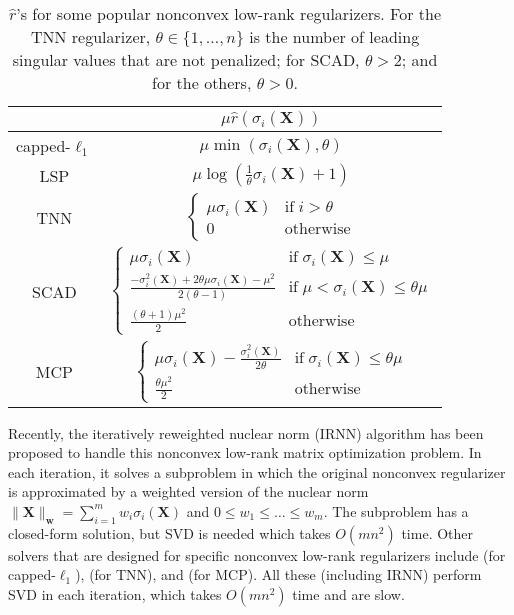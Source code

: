 \documentclass[10pt,journal,compsoc]{IEEEtran}
\newcommand{\X}{\mathbf{X}}
\newcommand{\NM}[2]{\| #1 \|_{#2} }
\begin{document}
\begin{table}[ht]
\centering
\caption{$\hat{r}$'s for some popular nonconvex low-rank regularizers. 
For the TNN regularizer, $\theta \in \{1,\dots,n\}$ is the number of leading singular values that are not penalized;
for SCAD, $\theta > 2$;
and for the others, $\theta > 0$.}
\vspace{-10px}
\begin{tabular}{c | c} \hline
	& $\mu\hat{r}(\sigma_i(\X))$
	\\ \hline
	capped-$\ell_1$ \cite{zhang2010analysis} & $\mu\min(\sigma_i(\X), \theta )$  \\ \hline
	LSP \cite{candes2008enhancing} & $\mu\log \left(\frac{1}{\theta} \sigma_i(\X) + 1\right)$  \\ \hline
	TNN \cite{hu2013fast,oh2016partial}
	& $\begin{cases}
	\mu\sigma_i(\X) & \text{if}\; i  > \theta \\
	0         & \text{otherwise}
	\end{cases}$
	\\ \hline
	SCAD \cite{fan2001variable} & 
	$\begin{cases}
	\mu \sigma_i(\X)                                                  &
	\text{if}\; \sigma_i(\X) \le \mu             \\
	\frac{-\sigma_i^2(\X) + 2 \theta \mu \sigma_i(\X) - \mu^2}{2(\theta - 1)} &
	\text{if}\; \mu < \sigma_i(\X) \le \theta\mu \\
	\frac{(\theta + 1) \mu^2}{2}                              & 
	\text{otherwise}
	\end{cases}$
	\\ \hline
	MCP \cite{zhang2010nearly} & 
	$\begin{cases}
	\mu \sigma_i(\X) - \frac{\sigma_i^2(\X)}{2 \theta} &
	\text{if}\; \sigma_i(\X) \le \theta \mu\\
	\frac{\theta \mu^2}{2}             & \text{otherwise}
	\end{cases}$
	\\ \hline
\end{tabular}
\label{tab:lwregu}
\end{table}

Recently,
the iteratively reweighted nuclear norm (\textsf{IRNN}) algorithm \cite{lu2016nonconvex}
has been proposed to handle this nonconvex low-rank matrix optimization problem. 
In each iteration,
it solves a subproblem
in which the original nonconvex regularizer is approximated by
a weighted version of the nuclear norm
$\NM{\X}{\mathbf{w}} = \sum_{i = 1}^m w_i \sigma_i(\X)$ 
and $0 \leq w_1 \le \dots \le w_m$.
The subproblem has a closed-form solution,
but SVD is needed which takes $O(m n^2)$ time.
Other solvers that are designed for specific nonconvex low-rank regularizers include \cite{sun2013robust} (for capped-$\ell_1$),
\cite{hu2013fast,oh2016partial} (for TNN),
and \cite{zhang2010nearly} (for MCP).
All these (including \textsf{IRNN}) perform SVD in each iteration,
which takes $O(m n^2)$ time and are slow.
\end{document}
